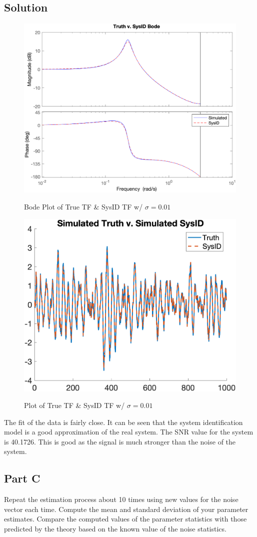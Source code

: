 \documentclass{article}
\begin{document}
\subsection*{Solution}
\begin{figure}[H]
    \centering
    \includegraphics[width=0.75\linewidth]{../figures/p4b_bode.png}\label{fig:p4b_bode}
    \caption{Bode Plot of True TF \& SysID TF w/ $\sigma=0.01$}
\end{figure}
\begin{figure}[H]
    \centering
    \includegraphics[width=0.75\linewidth]{../figures/p4b_tf.png}\label{fig:p4b_tf}
    \caption{Plot of True TF \& SysID TF w/ $\sigma=0.01$}
\end{figure}
The fit of the data is fairly close.  It can be seen that the system identification model is a good approximation of the real system. The SNR value 
for the system is 40.1726.  This is good as the signal is much stronger than the noise of the system.

\subsection*{Part C}
Repeat the estimation process about 10 times using new values for the noise vector each time.  Compute the mean and standard deviation of your 
parameter estimates.  Compare the computed values of the parameter statistics with those predicted by the theory based on the known value of 
the noise statistics.
\end{document}

